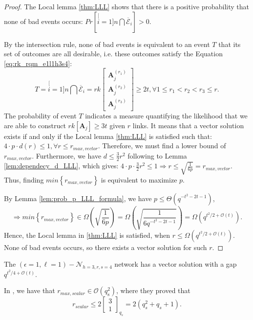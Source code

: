 \begin{proof}
The Local lemma \ref{thm:LLL} shows that there is a positive probability
that none of bad events occurs: $Pr\left[\stackrel[i=1]{n}{\bigcap}\overline{\mathcal{E}}_{i}\right]>0$.

By the intersection rule, none of bad events is equivalent to an event
$T$ that its set of outcomes are all desirable, i.e. these outcomes
satisfy the Equation \ref{eq:rk_rqm_e1l1h3s4}:
\[
T=\stackrel[i=1]{n}{\bigcap}\overline{\mathcal{E}}_{i}=rk\left[\begin{array}{c}
\boldsymbol{A}_{j}^{\left(r_{1}\right)}\\
\boldsymbol{A}_{j}^{\left(r_{2}\right)}\\
\boldsymbol{A}_{j}^{\left(r_{3}\right)}
\end{array}\right]\geq2t,\forall1\leq r_{1}<r_{2}<r_{3}\leq r.
\]
The probability of event $T$ indicates a measure quantifying the
likelihood that we are able to construct $rk\left[\boldsymbol{A}_{j}\right]\geq3t$
given $r$ links. It means that a vector solution exists if and only
if the Local lemma \ref{thm:LLL} is satisfied such that: $4\cdot p\cdot d(r)\leq1,\forall r\leq r_{max,vector}$.
Therefore, we must find a lower bound of $r_{max,vector}$. Furthermore,
we have $d\leq\frac{3}{2}r^{2}$ following to Lemma \ref{lem:dependecy_d_LLL},
which gives: $4\cdot p\cdot\frac{3}{2}r^{2}\leq1\Rightarrow r\leq\sqrt{\frac{1}{6p}}=r_{max,vector}$.
Thus, finding $min\left\{ r_{max,vector}\right\} $ is equivalent
to maximize $p$.

By Lemma \ref{lem:prob_p_LLL_formula}, we have $p\leq\Theta\left(q^{-t^{2}-2t-1}\right)$,
\[
\Rightarrow min\left\{ r_{max,vector}\right\} \in\Omega\left(\sqrt{\frac{1}{6p}}\right)=\Omega\left(\sqrt{\frac{1}{6q^{-t^{2}-2t-1}}}\right)=\Omega\left(q^{t^{2}/2+\mathcal{O}\left(t\right)}\right).
\]
Hence, the Local lemma in \ref{thm:LLL} is satisfied, when $r\leq\Omega\left(q^{t^{2}/2+\mathcal{O}\left(t\right)}\right)$.
None of bad events occurs, so there exists a vector solution for such
$r$.
\end{proof}
\begin{cor}
The $\left(\epsilon=1,\ell=1\right)-\mathcal{N}_{h=3,r,s=4}$ network
has a vector solution with a gap $q^{t^{2}/4+\mathcal{O}(t)}$.
\end{cor}
In \cite[Sec. VIII-C]{Wachter-Zeh:2018}, we have that $r_{max,scalar}\in\mathcal{O}\left(q_{\mathrm{s}}^{2}\right)$,
where they proved that
\begin{equation}
r_{scalar}\leq2\left[\begin{array}{c}
3\\
1
\end{array}\right]_{q_{s}}=2\left(q_{s}^{2}+q_{s}+1\right).\label{eq:r_scalar_max}
\end{equation}
